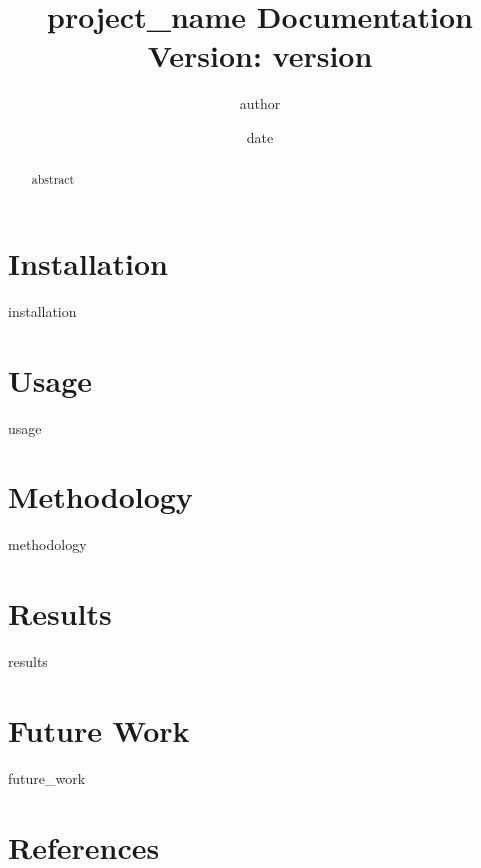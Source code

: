 \documentclass[a4paper,12pt]{article}
\title{{{{ project_name }}} Documentation \\[0.5em] \large Version: {{{{ version }}}}}
\author{{{{ author }}}}
\date{{{{ date }}}}
\begin{document}
\maketitle
\begin{abstract}
{{{ abstract }}}
\end{abstract}

\section{Installation}
{{{ installation }}}

\section{Usage}
{{{ usage }}}

\section{Methodology}
{{{ methodology }}}

\section{Results}
{{{ results }}}

\section{Future Work}
{{{ future_work }}}

\section{References}


\end{document}
